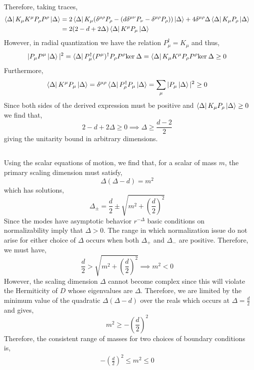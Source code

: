 \documentclass[12pt]{article}
\begin{document}
Therefore, taking traces,
\begin{align*}
\left< \Delta \right| K_\mu K^\mu P_{\rho} P^{\rho} \left| \Delta \right> 
& = 2 \left< \Delta \right| K_\mu (\delta^{\mu \rho} P_\rho - (d \delta^{\mu \nu} P_\nu - \delta^{\mu \rho} P_\rho))  \left| \Delta \right>  + 4 \delta^{\mu \rho} \Delta \left< \Delta \right| K_\mu  P_{\rho}  \left| \Delta \right>
\\
& = 2 (2 - d + 2 \Delta) \left< \Delta \right| K^\mu  P_{\mu}  \left| \Delta \right>
\end{align*}
However, in radial quantization we have the relation $P_\mu^\dagger = K_\mu$ and thus,
\[ | P_\mu P^\mu \left| \Delta \right>|^2 = \left< \Delta \right| P^\dagger_\mu (P^\mu)^\dagger P_\rho P^\rho \mathrm{ker} \: \Delta = \left< \Delta \right| K_\mu K^\mu P_\rho P^\rho \mathrm{ker} \: \Delta \ge 0 \]
Furthermore,
\[ \left< \Delta \right| K^\mu P_\mu \left| \Delta \right> = \delta^{\mu \rho} \left< \Delta \right| P^\dagger_\rho P_\mu \left| \Delta \right> = \sum_{\mu} |P_\mu \left| \Delta \right>|^2 \ge 0 \]
Since both sides of the derived expression must be positive and $\left< \Delta \right| K_\mu  P_{\rho}  \left| \Delta \right> \ge 0$ we find that,
\[ 2 - d + 2 \Delta \ge 0 \implies \Delta \ge \frac{d - 2}{2} \]
giving the unitarity bound in arbitrary dimensions. 

\subsection{}

Using the scalar equations of motion, we find that, for a scalar of mass $m$, the primary scaling dimension must satisfy,
\[ \Delta(\Delta - d) = m^2 \]
which has solutions,
\[ \Delta_{\pm} = \frac{d}{2} \pm \sqrt{m^2 + \left( \frac{d}{2} \right)^2} \] 
Since the modes have asymptotic behavior $r^{-\Delta}$ basic conditions on normalizability imply that $\Delta > 0$. The range in which normalization issue do not arise for either choice of $\Delta$ occurs when both $\Delta_{+}$ and $\Delta_{-}$ are positive. Therefore, we must have,
\[ \frac{d}{2} > \sqrt{m^2 + \left( \frac{d}{2} \right)^2} \implies m^2 < 0 \]
However, the scaling dimension $\Delta$ cannot become complex since this will violate the Hermiticity of $D$ whose eigenvalues are $\Delta$. Therefore, we are limited by the minimum value of the quadratic $\Delta (\Delta - d)$ over the reals which occurs at $\Delta = \frac{d}{2}$ and gives,
\[ m^2 \ge - \left( \frac{d}{2} \right)^2 \]
Therefore, the consistent range of masses for two choices of boundary conditions is,
\begin{align*}
- \left( \frac{d}{2} \right)^2 \le m^2 \le 0 
\end{align*}
\end{document}
